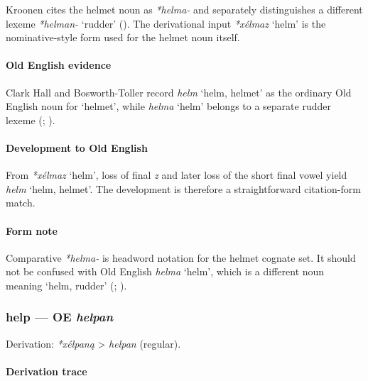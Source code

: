 \documentclass[
  british,
  a4paper,
]{article}
\providecommand{\Recon}[1]{\emph{*#1}}
\begin{document}
Kroonen cites the helmet noun as \emph{*helma-} and separately
distinguishes a different lexeme \emph{*helman-} `rudder'
(). The derivational input
\Recon{xélmaz} `helm' is the nominative-style form used for the helmet
noun itself.

\paragraph{Old English evidence}\label{old-english-evidence-36}

Clark Hall and Bosworth-Toller record {\emph{helm}} `helm, helmet' as
the ordinary Old English noun for `helmet', while {\emph{helma}} `helm'
belongs to a separate rudder lexeme (; ).

\paragraph{Development to Old
English}\label{development-to-old-english-36}

From \Recon{xélmaz} `helm', loss of final \emph{z} and later loss of the
short final vowel yield {\emph{helm}} `helm, helmet'. The development is
therefore a straightforward citation-form match.

\paragraph{Form note}\label{form-note-7}

Comparative \emph{*helma-} is headword notation for the helmet cognate
set. It should not be confused with Old English {\emph{helma}} `helm',
which is a different noun meaning `helm, rudder'
(;
).

\subsubsection{\texorpdfstring{help --- OE
\emph{helpan}}{help --- OE helpan}}\label{help-oe-helpan}

Derivation: \emph{*xélpaną} \textgreater{} \emph{helpan} (regular).

\paragraph{Derivation trace}\label{derivation-trace-43}
\end{document}

